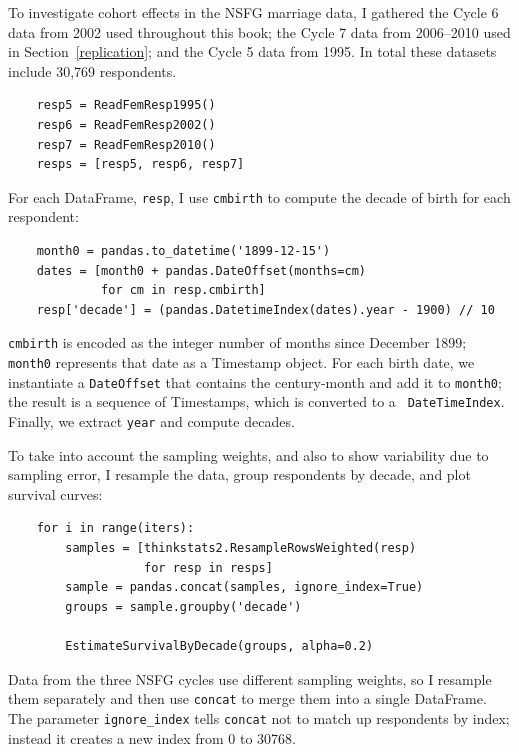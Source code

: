 \documentclass[12pt]{book}
\begin{document}
To investigate cohort effects in the NSFG marriage data, I gathered
the Cycle 6 data from 2002 used throughout this book;
the Cycle 7 data from 2006--2010 used in Section~\ref{replication};
and the Cycle 5 data from 1995.  In total these datasets include
30,769 respondents.

\begin{verbatim}
    resp5 = ReadFemResp1995()
    resp6 = ReadFemResp2002()
    resp7 = ReadFemResp2010()
    resps = [resp5, resp6, resp7]
\end{verbatim}

For each DataFrame, {\tt resp}, I use {\tt cmbirth} to compute the
decade of birth for each respondent:

\begin{verbatim}
    month0 = pandas.to_datetime('1899-12-15')
    dates = [month0 + pandas.DateOffset(months=cm) 
             for cm in resp.cmbirth]
    resp['decade'] = (pandas.DatetimeIndex(dates).year - 1900) // 10
\end{verbatim}

{\tt cmbirth} is encoded as the integer number of months since
December 1899; {\tt month0} represents that date as a Timestamp
object.  For each birth date, we instantiate a {\tt DateOffset} that
contains the century-month and add it to {\tt month0}; the result
is a sequence of Timestamps, which is converted to a {\tt
  DateTimeIndex}.  Finally, we extract {\tt year} and compute
decades.

To take into account the sampling weights, and also to show
variability due to sampling error, I resample the data,
group respondents by decade, and plot survival curves:

\begin{verbatim}
    for i in range(iters):
        samples = [thinkstats2.ResampleRowsWeighted(resp) 
                   for resp in resps]
        sample = pandas.concat(samples, ignore_index=True)
        groups = sample.groupby('decade')

        EstimateSurvivalByDecade(groups, alpha=0.2)
\end{verbatim}

Data from the three NSFG cycles use different sampling weights,
so I resample them separately and then use {\tt concat}
to merge them into a single DataFrame.  The parameter \verb"ignore_index"
tells {\tt concat} not to match up respondents by index; instead
it creates a new index from 0 to 30768.
\end{document}

